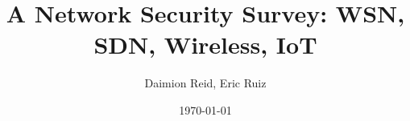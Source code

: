 \documentclass[format=acmsmall, review=false, screen=true]{acmart}
\begin{document}
	\title{A Network Security Survey: WSN, SDN, Wireless, IoT}
	\author{Daimion Reid, Eric Ruiz}
	\date {\today}


	\twocolumn


	

	

	

	

	

	

	 
	


\end{document}
